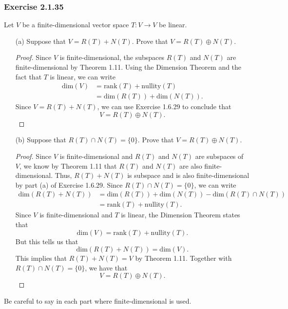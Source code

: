 \subsubsection{Exercise 2.1.35} Let \( V  \) be a finite-dimensional vector space \( T : V \to V  \) be linear. 
    \begin{enumerate}
        \item[(a)] Suppose that \( V = R(T) + N(T) \). Prove that \( V = R(T) \oplus N(T) \).
            \begin{proof}
            Since \( V  \) is finite-dimensional, the subspaces \( R(T)  \) and \( N(T) \) are finite-dimensional by Theorem 1.11. Using the Dimension Theorem and the fact that \( T  \) is linear, we can write
            \begin{align*}
                \text{dim}(V) &= \text{rank}(T) + \text{nullity}(T)   \\
                              &= \text{dim}(R(T)) + \text{dim}(N(T)).
            \end{align*}
            Since \( V = R(T) + N(T) \), we can use Exercise 1.6.29 to conclude that
            \[  V = R(T) \oplus N(T). \]
            \end{proof}
        \item[(b)] Suppose that \( R(T) \cap N(T) = \{ 0 \}  \). Prove that \( V = R(T) \oplus N(T) \).
            \begin{proof}
            Since \( V  \) is finite-dimensional and \( R(T) \) and \( N(T) \) are subspaces of \( V  \), we know by Theorem 1.11 that \( R(T) \) and \( N(T) \) are also finite-dimensional. Thus, \( R(T) + N(T) \) is subspace and is also finite-dimensional by part (a) of Exercise 1.6.29. Since \( R(T) \cap N(T) = \{ 0 \}  \), we can write 
            \begin{align*}
                \text{dim}(R(T) + N(T)) &= \text{dim}(R(T)) + \text{dim}(N(T)) - \text{dim}(R(T) \cap N(T)) \\
                                        &= \text{rank}(T) + \text{nullity}(T). 
            \end{align*}
            Since \( V  \) is finite-dimensional and \( T  \) is linear, the Dimension Theorem states that
            \[  \text{dim}(V) = \text{rank}(T) + \text{nullity}(T). \]
            But this tells us that 
            \[  \text{dim}(R(T) + N(T)) = \text{dim}(V).\]
            This implies that \( R(T) + N(T) = V  \) by Theorem 1.11. Together with \( R(T) \cap N(T) = \{ 0  \}   \), we have that 
            \[  V  = R(T) \oplus N(T). \]
            \end{proof}
    \end{enumerate}
Be careful to say in each part where finite-dimensional is used.

